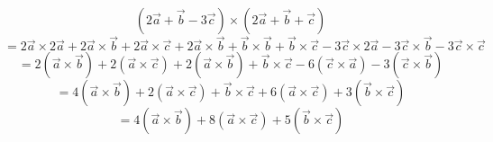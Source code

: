 \documentclass{article}
\begin{document}
\[ (2\vec{a} + \vec{b} - 3\vec{c}) \times (2\vec{a} + \vec{b} + \vec{c}) \]
\[ = 2\vec{a} \times 2\vec{a} + 2\vec{a} \times \vec{b} + 2\vec{a} \times \vec{c} + 2\vec{a} \times \vec{b} + \vec{b} \times \vec{b} + \vec{b} \times \vec{c} - 3\vec{c} \times 2\vec{a} - 3\vec{c} \times \vec{b} - 3\vec{c} \times \vec{c} \]
\[ = 2(\vec{a} \times \vec{b}) + 2(\vec{a} \times \vec{c}) + 2(\vec{a} \times \vec{b}) + \vec{b} \times \vec{c} - 6(\vec{c} \times \vec{a}) - 3(\vec{c} \times \vec{b}) \]
\[ = 4(\vec{a} \times \vec{b}) + 2(\vec{a} \times \vec{c}) + \vec{b} \times \vec{c} + 6(\vec{a} \times \vec{c}) + 3(\vec{b} \times \vec{c}) \]
\[ = 4(\vec{a} \times \vec{b}) + 8(\vec{a} \times \vec{c}) + 5(\vec{b} \times \vec{c}) \]
\end{document}
